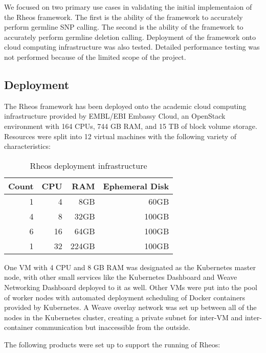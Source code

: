 We focused on two primary use cases in validating the initial implementaion of the Rheos framework. The first is the ability of the framework to accurately perform germline SNP calling. The second is the ability of the framework to accurately perform germline deletion calling. Deployment of the framework onto cloud computing infrastructure was also tested. Detailed performance testing was not performed because of the limited scope of the project.

\subsection{Deployment}

The Rheos framework has been deployed onto the academic cloud computing infrastructure provided by EMBL/EBI Embassy Cloud, an OpenStack environment with 164 CPUs, 744 GB RAM, and 15 TB of block volume storage. Resources were split into 12 virtual machines with the following variety of characteristics:

\begin{table}[!ht]
    \centering
    \caption{Rheos deployment infrastructure}
    \label{tab:rheos_deployment_infrastructure}
    {\begin{tabular}{r | r | r | r}
    \toprule
    Count & CPU & RAM & Ephemeral Disk \\
    \midrule
    1 & 4 & 8GB & 60GB\\
    4 & 8 & 32GB & 100GB\\
    6 & 16 & 64GB & 100GB\\
    1 & 32 & 224GB & 100GB\\
    \bottomrule
    \end{tabular}}
\end{table}

One VM with 4 CPU and 8 GB RAM was designated as the Kubernetes master node, with other small services like the Kubernetes Dashboard and Weave Networking Dashboard deployed to it as well. Other VMs were put into the pool of worker nodes with automated deployment scheduling of Docker containers provided by Kubernetes. A Weave overlay network was set up between all of the nodes in the Kubernetes cluster, creating a private subnet for inter-VM and inter-container communication but inaccessible from the outside.

The following products were set up to support the running of Rheos:

